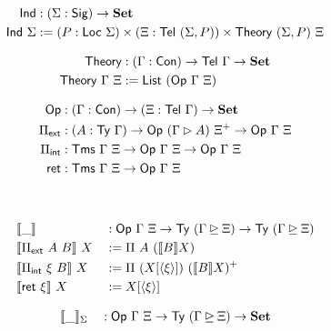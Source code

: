 \begin{figure}[h]
  \begin{minipage}[t]{0.5\textwidth}
  \begin{align*}
  \textsf{Ind} &: (\Sigma : \textsf{Sig}) \to \mathbf{Set} \\
  \textsf{Ind}\ \Sigma &:= (P : \textsf{Loc}\ \Sigma) \times (\Xi : \textsf{Tel}\ (\Sigma, P)) \times \textsf{Theory}\ (\Sigma, P)\ \Xi \\
  \end{align*}
  \end{minipage}
  \begin{minipage}[t]{0.5\textwidth}
  \begin{align*}
  \textsf{Theory} &: (\Gamma : \textsf{Con}) \to \textsf{Tel}\ \Gamma \to \mathbf{Set} \\
  \textsf{Theory}\ \Gamma\ \Xi &:= \textsf{List}\ (\textsf{Op}\ \Gamma\ \Xi)
  \end{align*}
  \end{minipage}
  \begin{minipage}[t]{0.5\textwidth}
  \begin{align*}
  \Op &: (\Gamma : \Con) \to (\Xi : \Tel\ \Gamma) \to \Set \\
  \Pi_{\mta{ext}} &: (A : \Ty\ \Gamma) \to \Op\ (\Gamma \rhd A)\ \Xi^+ \to \Op\ \Gamma\ \Xi \\
  \Pi_{\mta{int}} &: \Tms\ \Gamma\ \Xi \to \Op\ \Gamma\ \Xi \to \Op\ \Gamma\ \Xi \\
  \mta{ret} &: \Tms\ \Gamma\ \Xi \to \Op\ \Gamma\ \Xi
  \end{align*}
  \end{minipage}\\
  \begin{minipage}[t]{\textwidth}
  \begin{alignat*}{2}
  &\llbracket\_\rrbracket &&: \Op\ \Gamma\ \Xi \to \Ty\ (\Gamma \unrhd \Xi) \to \Ty\ (\Gamma \unrhd \Xi) \\
  &\llbracket \Pi_{\mta{ext}}\ A\ B \rrbracket\ X &&:= \Pi\ A\ (\llbracket B \rrbracket X) \\
  &\llbracket \Pi_{\mta{int}}\ \xi\ B \rrbracket\ X &&:= \Pi\ (X [\langle \xi \rangle])\ (\llbracket B \rrbracket X)^+ \\
  &\llbracket \mta{ret}\ \xi \rrbracket\ X &&:= X [\langle \xi \rangle]
  \end{alignat*}
  \end{minipage}
  \begin{minipage}[t]{\textwidth}
  \begin{alignat*}{2}
  &\llbracket\_\rrbracket_\Sigma &&: \Op\ \Gamma\ \Xi \to \Ty\ (\Gamma \unrhd \Xi) \to \Set \\

\end{alignat*}
\end{minipage}
\end{figure}
